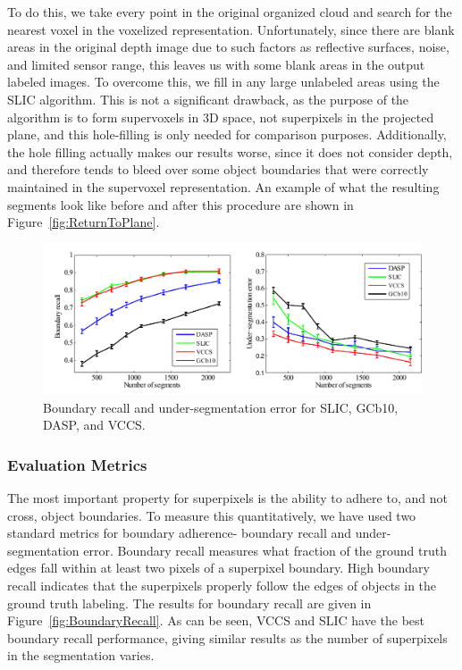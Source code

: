 To do this, we take every point in the original organized cloud and search for the nearest voxel in the voxelized representation. Unfortunately, since there are blank areas in the original depth image due to such factors as reflective surfaces, noise, and limited sensor range, this leaves us with some blank areas in the output labeled images. To overcome this, we fill in any large unlabeled areas using the SLIC algorithm. This is not a significant drawback, as the purpose of the algorithm is to form supervoxels in 3D space, not superpixels in the projected plane, and this hole-filling is only needed for comparison purposes. Additionally, the hole filling actually makes our results worse, since it does not consider depth, and therefore tends to bleed over some object boundaries that were correctly maintained in the supervoxel representation. An example of what the resulting segments look like before and after this procedure are shown in Figure~\ref{fig:ReturnToPlane}. 

\begin{figure}[t]
\begin{center}
\includegraphics[width=0.95\linewidth]{figures/CVPR2013/Performance.pdf}
\end{center}
   \caption[Boundary Recall \& Undersegmentation Error]{Boundary recall and under-segmentation error for SLIC, GCb10, DASP, and VCCS.}
\label{fig:BoundaryRecall}
\label{fig:UndersegError}
\end{figure}
\subsubsection{Evaluation Metrics}
The most important property for superpixels is the ability to adhere to, and not cross, object boundaries. To measure this quantitatively, we have used two standard metrics for boundary adherence- boundary recall and under-segmentation error\cite{Turbopixels, SuperpixelsSupervoxels}. Boundary recall measures what fraction of the ground truth edges fall within at least two pixels of a superpixel boundary. High boundary recall indicates that the superpixels properly follow the edges of objects in the ground truth labeling. The results for boundary recall are given in Figure~\ref{fig:BoundaryRecall}. As can be seen, VCCS and SLIC have the best boundary recall performance, giving similar results as the number of superpixels in the segmentation varies. 

